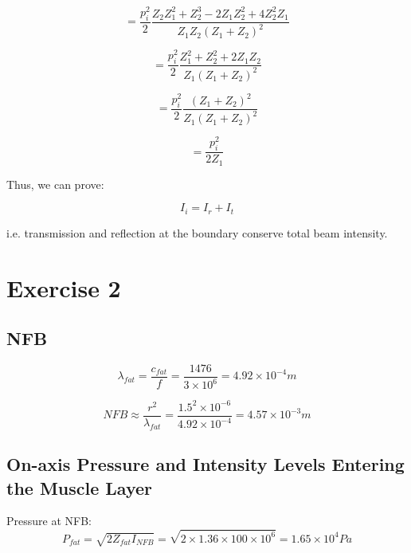 \documentclass[11pt,a4paper,BCOR12mm, headexclude, footexclude, twoside, openright]{scrartcl}
\numberwithin{equation}{section} %
\numberwithin{figure}{section} %
\numberwithin{table}{section} %
\begin{document}
\begin{equation}
      =\frac{p_i^2}{2}\frac{Z_2Z_1^2+Z_2^3-2Z_1Z_2^2+4Z_2^2Z_1}{Z_1Z_2(Z_1+Z_2)^2}
\end{equation}

\begin{equation}
      =\frac{p_i^2}{2}\frac{Z_1^2+Z_2^2+2Z_1Z_2}{Z_1(Z_1+Z_2)^2}
\end{equation}

\begin{equation}
      =\frac{p_i^2}{2}\frac{(Z_1+Z_2)^2}{Z_1(Z_1+Z_2)^2}
\end{equation}

\begin{equation}
      =\frac{p_i^2}{2Z_1}
\end{equation}

Thus, we can prove:

\begin{equation}
      I_i = I_r + I_t
\end{equation}

i.e. transmission and reflection at the boundary conserve total beam intensity.

\newpage

\section{Exercise 2}
\subsection{NFB} 

\begin{equation}
      \lambda_{fat} = \frac{c_{fat}}{f}=\frac{1476}{3\times10^6}=4.92\times10^{-4}m
\end{equation}

\begin{equation}
      NFB \approx \frac{r^2}{\lambda_{fat}} = \frac{1.5^2\times10^{-6}}{4.92\times10^{-4}}=4.57\times10^{-3}m
\end{equation}

\subsection{On-axis Pressure and Intensity Levels Entering the Muscle Layer} 

Pressure at NFB:
\begin{equation}
    P_{fat} = \sqrt{2Z_{fat}I_{NFB}}=  \sqrt{2\times1.36\times100\times10^6}=1.65\times10^4Pa
\end{equation}
\end{document}
